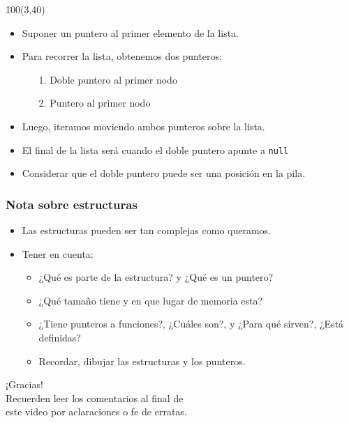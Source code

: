 \documentclass[aspectratio=169]{beamer}
\begin{document}
\begin{frame}[fragile]
    \begin{textblock}{100}(3,40)
    \begin{itemize}
    \setlength\itemsep{0.2cm}
    \item<2->[-] \small Suponer un puntero al primer elemento de la lista.
    \item<3->[-] \small Para recorrer la lista, obtenemos dos punteros:
    \begin{itemize}
    \footnotesize
     \item[1.] Doble puntero al primer nodo
     \item[2.] Puntero al primer nodo
    \end{itemize}
    \item<4->[-] \small Luego, iteramos moviendo ambos punteros sobre la lista.
    \item<7->[-] \small El final de la lista será cuando el doble puntero apunte a \texttt{null}
    \item<8->[-] \small Considerar que el doble puntero puede ser una posición en la pila.
    \end{itemize}
    \end{textblock}
\end{frame}

\begin{frame}[fragile]
    \frametitle{Nota sobre estructuras}
    \large
    \begin{itemize}
    \setlength\itemsep{0.4cm}
    \item<1->[-] Las estructuras pueden ser tan complejas como queramos.
    \item<2->[-] Tener en cuenta:
    \begin{itemize}
    \vspace{0.4cm}
    \setlength\itemsep{0.4cm}
     \item<2->[$\cdot$] ¿Qué es parte de la estructura? y ¿Qué es un puntero?
     \item<3->[$\cdot$] ¿Qué tamaño tiene y en que lugar de memoria esta?
     \item<4->[$\cdot$] ¿Tiene punteros a funciones?, ¿Cuáles son?, y ¿Para qué sirven?, ¿Está definidas?
     \item<5->[$\cdot$] Recordar, dibujar las estructuras y los punteros.
    \end{itemize}
    \end{itemize}
\end{frame}

\begin{frame}[plain]
    \begin{center}
    \vspace{2cm}
    \huge ¡Gracias!\\
    \vspace{2cm}
    \normalsize Recuerden leer los comentarios al final de \\ este video por aclaraciones o fe de erratas.
    \end{center}
\end{frame}
\end{document}
